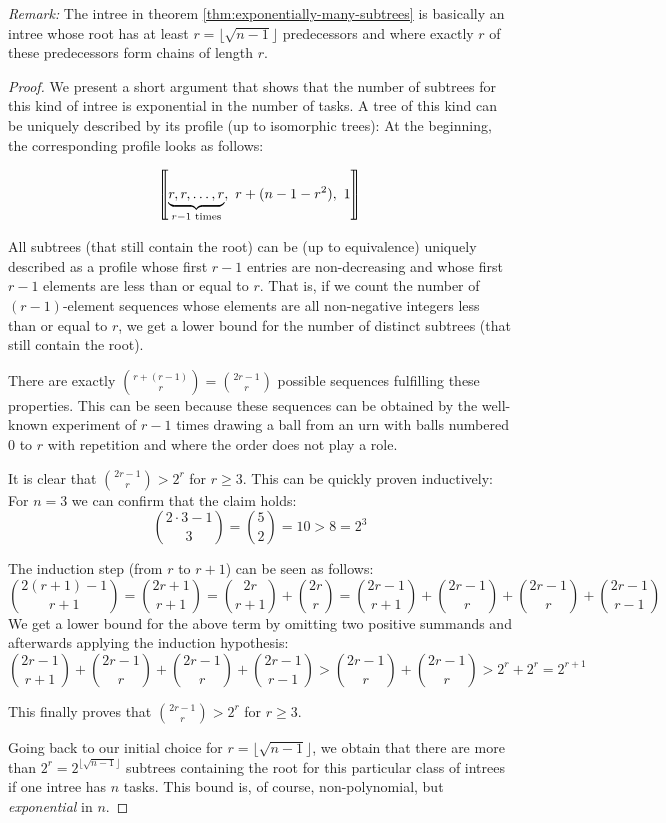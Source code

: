 \emph{Remark:} The intree in theorem \ref{thm:exponentially-many-subtrees} is basically an intree whose root has at least $r = \lfloor \sqrt{n-1} \rfloor$ predecessors and where exactly $r$ of these predecessors form chains of length $r$.

\begin{proof}
  We present a short argument that shows that the number of subtrees for this kind of intree is exponential in the number of tasks. A tree of this kind can be uniquely described by its profile (up to isomorphic trees): At the beginning, the corresponding profile looks as follows:

\begin{equation*}
  \profile{
    \underbrace{r, r, \dots, r}_{r-1 \text{ times}},
    \ 
    r+(n-1-r^2),
    \ 
    1
  }
\end{equation*}

All subtrees (that still contain the root) can be (up to equivalence) uniquely described as a profile whose first $r-1$ entries are non-decreasing and whose first $r-1$ elements are less than or equal to $r$. That is, if we count the number of $(r-1)$-element sequences whose elements are all non-negative integers less than or equal to $r$, we get a lower bound for the number of distinct subtrees (that still contain the root).

There are exactly $\binom{r+(r-1)}{r}=\binom{2r-1}{r}$ possible sequences fulfilling these properties. This can be seen because these sequences can be obtained by the well-known experiment of $r-1$ times drawing a ball from an urn with balls numbered 0 to $r$ with repetition and where the order does not play a role.

It is clear that $\binom{2r-1}{r} > 2^r$ for $r\geq 3$. This can be quickly proven inductively: For $n=3$ we can confirm that the claim holds:
\begin{equation*}
  \binom{2\cdot 3 - 1}{3} =\binom{5}{2} = 10 > 8 = 2^3
\end{equation*}

The induction step (from $r$ to $r+1$) can be seen as follows:
\begin{equation*}
  \binom{2(r+1) - 1}{r+1} =
  \binom{2r+1}{r+1} = 
  \binom{2r}{r+1} + \binom{2r}{r} =
  \binom{2r-1}{r+1} + \binom{2r-1}{r} + \binom{2r-1}{r} + \binom{2r-1}{r-1}
\end{equation*}
We get a lower bound for the above term by omitting two positive summands and afterwards applying the induction hypothesis:
\begin{equation*}
  \binom{2r-1}{r+1} + \binom{2r-1}{r} + \binom{2r-1}{r} + \binom{2r-1}{r-1} >
  \binom{2r-1}{r} + \binom{2r-1}{r} >
  2^r + 2^r =
  2^{r+1}
\end{equation*}

This finally proves that $\binom{2r-1}{r} > 2^r$ for $r\geq 3$.

Going back to our initial choice for $r=\lfloor\sqrt{n-1}\rfloor$, we obtain that there are more than $2^{r} = 2^{\lfloor\sqrt{n-1}\rfloor}$ subtrees containing the root for this particular class of intrees if one intree has $n$ tasks. This bound is, of course, non-polynomial, but \emph{exponential} in $n$.
\end{proof}

